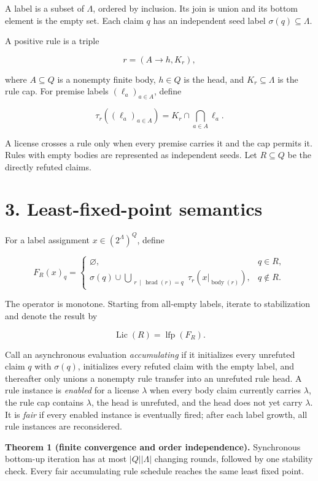 \documentclass[
  11pt,
]{article}
\begin{document}
A label is a subset of \(\Lambda\), ordered by inclusion. Its join is
union and its bottom element is the empty set. Each claim \(q\) has an
independent seed label \(\sigma(q)\subseteq\Lambda\).

A positive rule is a triple

\[
r=(A\to h, K_r),
\]

where \(A\subseteq Q\) is a nonempty finite body, \(h\in Q\) is the
head, and \(K_r\subseteq\Lambda\) is the rule cap. For premise labels
\((\ell_a)_{a\in A}\), define

\[
\tau_r((\ell_a)_{a\in A})
=K_r\cap\bigcap_{a\in A}\ell_a.
\]

A license crosses a rule only when every premise carries it and the cap
permits it. Rules with empty bodies are represented as independent
seeds. Let \(R\subseteq Q\) be the directly refuted claims.

\hypertarget{least-fixed-point-semantics}{%
\section{3. Least-fixed-point
semantics}\label{least-fixed-point-semantics}}

For a label assignment \(x\in(2^\Lambda)^Q\), define

\[
F_R(x)_q=
\begin{cases}
\varnothing,&q\in R, \\
\displaystyle\sigma(q)\cup
\bigcup_{\substack{r\,\mid\,\operatorname{head}(r)=q}}
\tau_r(x|_{\operatorname{body}(r)}),&q\notin R.
\end{cases}
\]

The operator is monotone. Starting from all-empty labels, iterate to
stabilization and denote the result by

\[
\operatorname{Lic}(R)=\operatorname{lfp}(F_R).
\]

Call an asynchronous evaluation \emph{accumulating} if it initializes
every unrefuted claim \(q\) with \(\sigma(q)\), initializes every
refuted claim with the empty label, and thereafter only unions a
nonempty rule transfer into an unrefuted rule head. A rule instance is
\emph{enabled} for a license \(\lambda\) when every body claim currently
carries \(\lambda\), the rule cap contains \(\lambda\), the head is
unrefuted, and the head does not yet carry \(\lambda\). It is
\emph{fair} if every enabled instance is eventually fired; after each
label growth, all rule instances are reconsidered.

\textbf{Theorem 1 (finite convergence and order independence).}
Synchronous bottom-up iteration has at most \(|Q||\Lambda|\) changing
rounds, followed by one stability check. Every fair accumulating rule
schedule reaches the same least fixed point.
\end{document}
